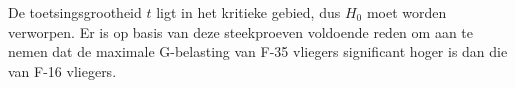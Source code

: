 \begin{question}{28}
{        De toetsingsgrootheid $t$ ligt in het kritieke gebied, dus $H_0$ moet worden verworpen.
        Er is op basis van deze steekproeven voldoende reden om aan te nemen dat de maximale G-belasting van F-35 vliegers significant hoger is dan die van F-16 vliegers. 
    }    

\end{question}